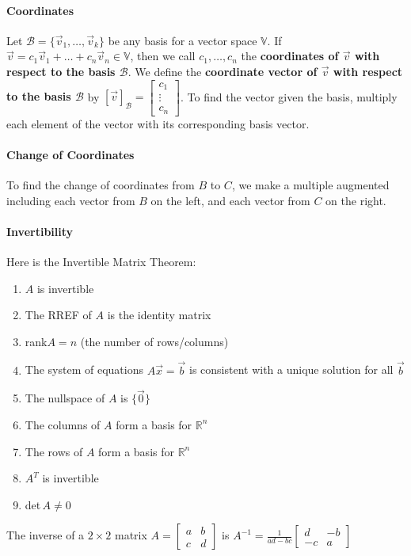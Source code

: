 \documentclass[10pt,letter]{article}
\begin{document}
\paragraph{Coordinates} Let $\mathcal{B} =\{\vec{v}_1,\ldots,\vec{v}_k\}$ be any basis for a vector space $\mathbb{V}$. If $\vec{v}=c_1\vec{v}_1+\ldots+c_n\vec{v}_n\in\mathbb{V}$, then we call $c_1,\ldots,c_n$ the \textbf{coordinates of $\vec{v}$ with respect to the basis $\mathcal{B}$}. We define the \textbf{coordinate vector of $\vec{v}$ with respect to the basis $\mathcal{B}$} by $[\vec{v}]_\mathcal{B}=\begin{bmatrix}c_1\\\vdots\\c_n\end{bmatrix}$. To find the vector given the basis, multiply each element of the vector with its corresponding basis vector. 

\paragraph{Change of Coordinates} To find the change of coordinates from $B$ to $C$, we make a multiple augmented including each vector from $B$ on the left, and each vector from $C$ on the right. 

\paragraph{Invertibility} Here is the Invertible Matrix Theorem: \begin{enumerate}
    \item $A$ is invertible 
    \item The RREF of $A$ is the identity matrix 
    \item rank$A=n$ (the number of rows/columns) 
    \item The system of equations $A\vec{x}=\vec{b}$ is consistent with a unique solution for all $\vec{b}$ 
    \item The nullspace of $A$ is $\{\vec{0}\}$ 
    \item The columns of $A$ form a basis for $\mathbb{R}^n$ 
    \item The rows of $A$ form a basis for $\mathbb{R}^n$ 
    \item $A^T$ is invertible 
    \item det$\,A\neq0$
\end{enumerate}
The inverse of a $2\times 2$ matrix $A=\begin{bmatrix}a&b\\c&d\end{bmatrix}$ is $A^{-1}=\frac{1}{ad-bc}\begin{bmatrix}d&-b\\-c&a\end{bmatrix}$
\end{document}
